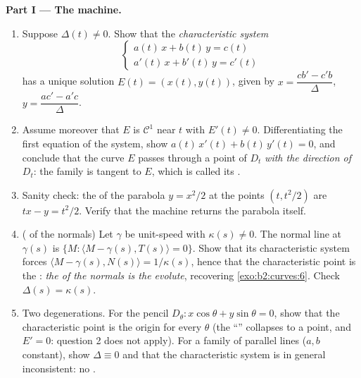 \begin{problem}
\medskip
\noindent\textbf{Part I --- The  machine.}
\begin{enumerate}
  \item Suppose $\Delta(t) \neq 0$. Show that the
        \emph{characteristic system}
        \[
        \begin{cases} a(t)\,x + b(t)\,y = c(t)\\
        a'(t)\,x + b'(t)\,y = c'(t)\end{cases}
        \]
        has a unique solution $E(t) = (x(t), y(t))$, given by
        $x = \dfrac{cb' - c'b}{\Delta}$, $y = \dfrac{ac' -
        a'c}{\Delta}$.
  \item Assume moreover that $E$ is $\mathcal C^1$ near $t$
        with $E'(t) \neq 0$. Differentiating the first
        equation of the system, show $a(t)\,x'(t) +
        b(t)\,y'(t) = 0$, and conclude that the curve $E$
        passes through a point of $D_t$ \emph{with the
        direction of} $D_t$: the family is tangent to $E$,
        which is called its \emph{}.
  \item Sanity check: the  of the parabola $y =
        x^2/2$ at the points $(t, t^2/2)$ are $tx - y =
        t^2/2$. Verify that the  machine returns the
        parabola itself.
  \item ( of the normals) Let $\gamma$ be unit-speed
        with $\kappa(s) \neq 0$. The normal line at
        $\gamma(s)$ is $\{M : \langle M - \gamma(s), T(s)
        \rangle = 0\}$. Show that its characteristic system
        forces $\langle M - \gamma(s), N(s)\rangle =
        1/\kappa(s)$, hence that the characteristic point is
        the : \emph{the  of the
        normals is the evolute}, recovering
        \cref{exo:b2:curves:6}. Check $\Delta(s) =
        \kappa(s)$.
  \item Two degenerations. For the pencil $D_\theta : x\cos
        \theta + y\sin\theta = 0$, show that the
        characteristic point is the origin for every $\theta$
        (the ``'' collapses to a point, and $E' = 0$:
        question 2 does not apply). For a family of parallel
        lines ($a, b$ constant), show $\Delta \equiv 0$ and
        that the characteristic system is in general
        inconsistent: no .
\end{enumerate}


\end{problem}
